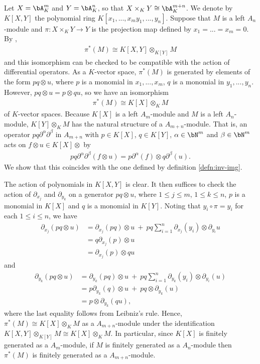 \begin{example}[Projections]\label{example:pullback-projection}
	Let $X = \bA^m_K$ and $Y = \bA^n_K$, so that $X\times_K Y \cong \bA^{m+n}_K$. We denote by $K[X,Y]$ the polynomial ring $K[x_1,...,x_m y_1,...,y_n]$. Suppose that $M$ is a left $A_n$-module and $\pi:X\times_K Y\to Y$ is the projection map defined by $x_1=...=x_m=0$. By \cite[Proposition 2.5.2]{hartshorne},
	\begin{align*}
		\pi^*(M) \cong K[X,Y]\otimes_{K[Y]} M
	\end{align*}
	and this isomorphism can be checked to be compatible with the action of differential operators. As a $K$-vector space, $\pi^*(M)$ is generated by elements of the form $pq \otimes u$, where $p$ is a monomial in $x_1,...,x_m$, $q$ is a monomial in $y_1,...,y_n$. However, $pq\otimes u = p\otimes qu$, so we have an isomorphism
	\begin{align*}
		\pi^*(M) \cong K[X]\otimes_K M
	\end{align*}
    of $K$-vector spaces. Because $K[X]$ is a left $A_m$-module and $M$ is a left $A_n$-module, $K[Y]\otimes_K M$ has the natural structure of a $A_{m+n}$-module. That is, an operator $pq\partial^\alpha\partial^\beta$ in $A_{m+n}$ with $p\in K[X]$, $q\in K[Y]$, $\alpha \in \bN^m$ and $\beta \in \bN^m$ acts on $f\otimes u \in K[X]\otimes$ by
	\begin{align*}
		pq\partial^\alpha\partial^\beta(f\otimes u) = p\partial^{\alpha}(f) \otimes q\partial^\beta(u).
	\end{align*}
	We show that this coincides with the one defined by definition \ref{defn:inv-img}.

	The action of polynomials in $K[X,Y]$ is clear. It then suffices to check the action of $\partial_{x_j}$ and $\partial_{y_k}$ on a generator $pq\otimes u$, where $1\leq j\leq m$, $1\leq k\leq n$, $p$ is a monomial in $K[X]$ and $q$ is a monomial in $K[Y]$. Noting that $y_i\circ \pi = y_i$ for each $1\leq i\leq n$, we have
	\begin{align*}
		\partial_{x_j}(pq\otimes u)
		  &= \partial_{x_j}(pq) \otimes u ~+~ pq\sum_{i=1}^n \partial_{x_j}(y_i) \otimes \partial_{y_i}u \\
		  &= q\partial_{x_j}(p) \otimes u \\
		  &= \partial_{x_j}(p)\otimes qu
	\end{align*}
	and
	\begin{align*}
		\partial_{y_k}(pq\otimes u)
		  &= \partial_{y_k}(pq) \otimes u ~+~ pq\sum_{i=1}^n \partial_{y_k}(y_i) \otimes \partial_{y_i}(u) \\
		  &= p\partial_{y_k}(q) \otimes u ~+~ pq\otimes \partial_{y_k}(u) \\
		  &= p\otimes \partial_{y_k}(qu),
	\end{align*}
	where the last equality follows from Leibniz's rule. Hence, $\pi^*(M) \cong K[X]\otimes_K M$ as a $A_{m+n}$-module under the identification $K[X,Y]\otimes_{K[Y]}M \cong K[X]\otimes_K M$. In particular, since $K[X]$ is finitely generated as a $A_m$-module, if $M$ is finitely generated as a $A_n$-module then $\pi^*(M)$ is finitely generated as a $A_{m+n}$-module.
\end{example}

